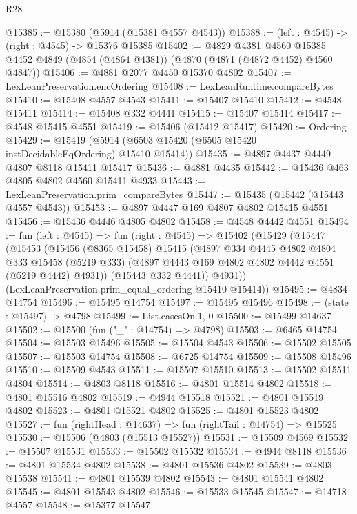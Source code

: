 \begin{lexlean}{R28}
\begin{coremodule}
@15385 := @15380 (@5914 (@15381 @4557 @4543))
@15388 := (left : @4545) -> (right : @4545) -> @15376 @15385
@15402 := @4829
    @4381
    @4560
    @15385
    @4452
    @4849
    (@4854 (@4864 @4381))
    (@4870 (@4871 (@4872 @4452) @4560 @4847))
@15406 := @4881 @2077 @4450 @15370 @4802
@15407 := LexLeanPreservation.encOrdering
@15408 := LexLeanRuntime.compareBytes
@15410 := @15408 @4557 @4543
@15411 := @15407 @15410
@15412 := @4548 @15411
@15414 := @15408 @332 @4441
@15415 := @15407 @15414
@15417 := @4548 @15415 @4551
@15419 := @15406 (@15412 @15417)
@15420 := Ordering
@15429 := @15419 (@5914 (@6503 @15420 (@6505 @15420 instDecidableEqOrdering) @15410 @15414))
@15435 := @4897 @4437 @4449 @4807 @8118 @15411 @15417
@15436 := @4881 @4435
@15442 := @15436 @463 @4805 @4802 @4560 @15411 @4933
@15443 := LexLeanPreservation.prim_compareBytes
@15447 := @15435 (@15442 (@15443 @4557 @4543))
@15453 := @4897 @4447 @169 @4807 @4802 @15415 @4551
@15456 := @15436 @4446 @4805 @4802
@15458 := @4548 @4442 @4551
@15494 := fun (left : @4545) =>
  fun (right : @4545) =>
  @15402
    (@15429
      (@15447
        (@15453
          (@15456
            (@8365 @15458)
            @15415
            (@4897
              @334
              @4445
              @4802
              @4804
              @333
              @15458
              (@5219 @333)
              (@4897 @4443 @169 @4802 @4802 @4442 @4551 (@5219 @4442) @4931))
            (@15443 @332 @4441))
          @4931))
      (LexLeanPreservation.prim_equal_ordering @15410 @15414))
@15495 := @4834 @14754
@15496 := @15495 @14754
@15497 := @15495 @15496
@15498 := (state : @15497) -> @4798
@15499 := List.casesOn.{1, 0}
@15500 := @15499 @14637
@15502 := @15500 (fun ("_" : @14754) => @4798)
@15503 := @6465 @14754
@15504 := @15503 @15496
@15505 := @15504 @4543
@15506 := @15502 @15505
@15507 := @15503 @14754
@15508 := @6725 @14754
@15509 := @15508 @15496
@15510 := @15509 @4543
@15511 := @15507 @15510
@15513 := @15502 @15511 @4804
@15514 := @4803 @8118
@15516 := @4801 @15514 @4802
@15518 := @4801 @15516 @4802
@15519 := @4944 @15518
@15521 := @4801 @15519 @4802
@15523 := @4801 @15521 @4802
@15525 := @4801 @15523 @4802
@15527 := fun (rightHead : @14637) => fun (rightTail : @14754) => @15525
@15530 := @15506 (@4803 (@15513 @15527))
@15531 := @15509 @4569
@15532 := @15507 @15531
@15533 := @15502 @15532
@15534 := @4944 @8118
@15536 := @4801 @15534 @4802
@15538 := @4801 @15536 @4802
@15539 := @4803 @15538
@15541 := @4801 @15539 @4802
@15543 := @4801 @15541 @4802
@15545 := @4801 @15543 @4802
@15546 := @15533 @15545
@15547 := @14718 @4557
@15548 := @15377 @15547

\end{coremodule}
\end{lexlean}
